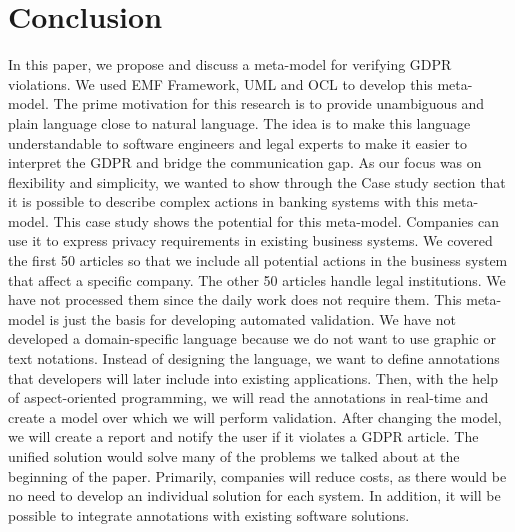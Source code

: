 \documentclass[11pt,english]{article}
\begin{document}
\section{Conclusion}
In this paper, we propose and discuss a meta-model for verifying GDPR violations. We used EMF Framework, UML and OCL to develop this meta-model. The prime motivation for this research is to provide unambiguous and plain language close to natural language. The idea is to make this language understandable to software engineers and legal experts to make it easier to interpret the GDPR and bridge the communication gap. \newline As our focus was on flexibility and simplicity, we wanted to show through the Case study section that it is possible to describe complex actions in banking systems with this meta-model. This case study shows the potential for this meta-model. Companies can use it to express privacy requirements in existing business systems. We covered the first 50 articles so that we include all potential actions in the business system that affect a specific company. The other 50 articles handle legal institutions. We have not processed them since the daily work does not require them. \newline This meta-model is just the basis for developing automated validation. We have not developed a domain-specific language because we do not want to use graphic or text notations. Instead of designing the language, we want to define annotations that developers will later include into existing applications. Then, with the help of aspect-oriented programming, we will read the annotations in real-time and create a model over which we will perform validation. After changing the model, we will create a report and notify the user if it violates a GDPR article. The unified solution would solve many of the problems we talked about at the beginning of the paper. Primarily, companies will reduce costs, as there would be no need to develop an individual solution for each system. In addition, it will be possible to integrate annotations with existing software solutions.
\printbibliography
\end{document}
